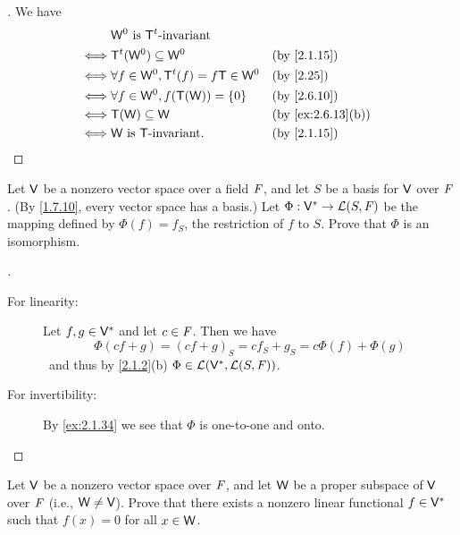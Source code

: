 \begin{proof}[]
  We have
  \begin{align*}
         & \W^0 \text{ is } \tp{\T} \text{-invariant}                                          \\
    \iff & \tp{\T}(\W^0) \subseteq \W^0                   &  & \text{(by \cref{2.1.15})}       \\
    \iff & \forall f \in \W^0, \tp{\T}(f) = f \T \in \W^0 &  & \text{(by \cref{2.25})}         \\
    \iff & \forall f \in \W^0, f(\T(\W)) = \set{0}        &  & \text{(by \cref{2.6.10})}       \\
    \iff & \T(\W) \subseteq \W                            &  & \text{(by \cref{ex:2.6.13}(b))} \\
    \iff & \W \text{ is } \T \text{-invariant}.           &  & \text{(by \cref{2.1.15})}
  \end{align*}
\end{proof}

\begin{ex}\label{ex:2.6.18}
  Let \(\mathsf{V}\) be a nonzero vector space over a field \(\mathit{F}\), and let \(S\) be a basis for \(\mathsf{V}\) over \(\mathit{F}\).
  (By \cref{1.7.10}, every vector space has a basis.)
  Let \(\Phi : \mathsf{V}^* \to \mathcal{L}(S, \mathit{F})\) be the mapping defined by \(\Phi(f) = f_S\), the restriction of \(f\) to \(S\).
  Prove that \(\Phi\) is an isomorphism.
\end{ex}

\begin{proof}[]
  \begin{description}
    \item[For linearity:]
      Let \(f, g \in \mathsf{V}^*\) and let \(c \in \mathit{F}\).
      Then we have
      \[
        \Phi(cf + g) = (cf + g)_S = c f_S + g_S = c \Phi(f) + \Phi(g)
      \]\
      and thus by \cref{2.1.2}(b) \(\Phi \in \mathcal{L}(\mathsf{V}^*, \mathcal{L}(S, \mathit{F}))\).
    \item[For invertibility:]
      By \cref{ex:2.1.34} we see that \(\Phi\) is one-to-one and onto.
  \end{description}
\end{proof}

\begin{ex}\label{ex:2.6.19}
  Let \(\mathsf{V}\) be a nonzero vector space over \(\mathit{F}\), and let \(\mathsf{W}\) be a proper subspace of \(\mathsf{V}\) over \(\mathit{F}\)
  (i.e., \(\mathsf{W} \neq \mathsf{V}\)).
  Prove that there exists a nonzero linear functional \(f \in \mathsf{V}^*\) such that \(f(x) = 0\) for all \(x \in \mathsf{W}\).
\end{ex}

